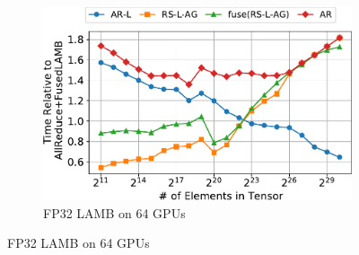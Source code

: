 \begin{figure}
\begin{subfigure}{0.66\columnwidth}
    \includegraphics[width=\columnwidth]{figures/results-lamb-64-gpus.pdf}  
    \caption{FP32 LAMB on 64 GPUs}
  \end{subfigure}
  


\end{figure}
